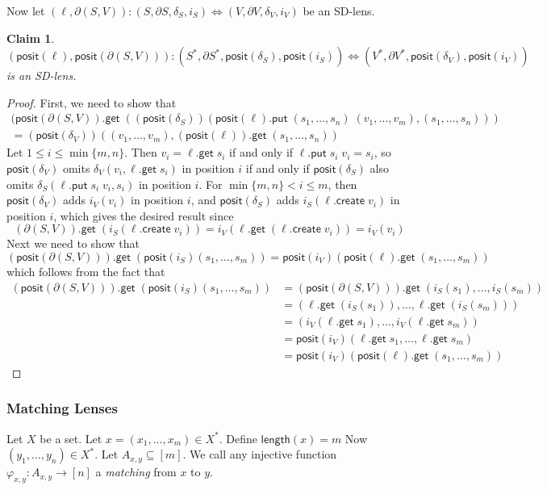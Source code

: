 \documentclass[acmsmall,review,anonymous]{acmart}\settopmatter{printfolios=true,printccs=false,printacmref=false}
\newtheorem{claim}{Claim}
\newcommand{\kw}[1]{\ensuremath{\mathsf{#1}}\xspace}
\newcommand{\get}{\ensuremath{\kw{get}}\xspace}
\newcommand{\pput}{\ensuremath{\kw{put}}\xspace}
\newcommand{\create}{\ensuremath{\kw{create}}\xspace}
\newcommand{\pos}{\ensuremath{\kw{posit}}\xspace}
\newcommand{\length}{\ensuremath{\kw{length}}\xspace}
\begin{document}
Now let $(\ell, \partial (S, V)) : (S, \partial S, \delta_{S}, i_{S})
\Leftrightarrow (V, \partial V, \delta_{V}, i_{V})$ be an SD-lens.
\begin{claim}\label{positionalisvalid}
$(\pos(\ell), \pos(\partial (S, V))) : (S^*, \partial S^*, \pos(\delta_{S}),
\pos(i_{S})) \Leftrightarrow (V^*, \partial V^*, \pos(\delta_{V}), \pos(i_{V}))$
is an SD-lens.
\end{claim}
\begin{proof}
First, we need to show that
\begin{multline}
(\pos(\partial (S, V)).\get \;
((\pos(\delta_S))(\pos(\ell).\pput \; (s_1, \ldots, s_n) \; (v_1, \ldots,
v_m), (s_1, \ldots, s_n))) \\
= (\pos(\delta_V))((v_1, \ldots, v_m), (\pos(\ell)).\get \; (s_1, \ldots, s_n))
\end{multline}
Let $1 \leq i \leq \min\{m, n\}$. Then $v_i = \ell.\get \; s_i$ if and only if
$\ell.\pput \; s_i \; v_i = s_i$, so $\pos(\delta_V)$ omits $\delta_V(v_i,
\ell.\get \; s_i)$ in position $i$ if and only if $\pos(\delta_S)$ also omits
$\delta_S(\ell.\pput \; s_i \; v_i, s_i)$ in position $i$. For $\min\{m,n\}
< i \leq m$, then $\pos(\delta_V)$ adds $i_V(v_i)$ in position $i$, and
$\pos(\delta_S)$ adds $i_S(\ell.\create \; v_i)$ in position $i$, which gives
the desired result since
$$(\partial (S, V)).\get \; (i_S(\ell.\create \; v_i)) = i_V(\ell.\get \;
(\ell.\create \; v_i)) = i_V(v_i)$$
Next we need to show that
$$(\pos(\partial (S, V))).\get \; ({\pos(i_S)}(s_1, \ldots, s_m)) =
\pos(i_V)(\pos(\ell).\get \; (s_1, \ldots, s_m))$$
which follows from the fact that
\begin{align*}
(\pos(\partial (S, V))).\get \; ({\pos(i_S)}(s_1, \ldots, s_m)) &=
(\pos(\partial (S, V))).\get \; ({i_S}(s_1), \ldots, {i_S}(s_m))\\
&= (\ell.\get \; (i_S(s_1)), \ldots, \ell.\get \; (i_S(s_m)))\\
&= (i_V(\ell.\get \; s_1), \ldots, i_V(\ell.\get \; s_m))\\
&= \pos(i_V)(\ell.\get \; s_1, \ldots, \ell.\get \; s_m)\\
&= \pos(i_V)(\pos(\ell).\get \; (s_1, \ldots, s_m))
\end{align*}
\end{proof}
\subsubsection{Matching Lenses}
Let $X$ be a set. Let $x = (x_1, \ldots, x_m) \in X^*$. Define $\length(x) = m$
Now $(y_1, \ldots, y_n) \in X^*$. Let $A_{x, y} \subseteq [m]$. We call any
injective function $\varphi_{x, y} : A_{x, y} \longrightarrow [n]$ a {\em
matching} from $x$ to $y$.
\end{document}
